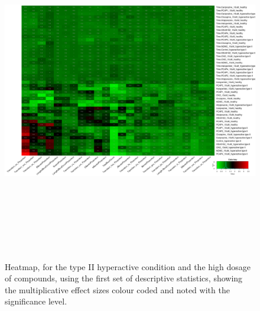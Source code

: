 \documentclass[a4paper,12pt]{article}
\begin{document}
\begin{figure}[h!]
\begin{center}
\includegraphics[width=16cm,height=15cm]{DarkPTZ_heatmap_10_microM_DarkPTZ_B2MAP.png}
\caption{Heatmap, for the type II hyperactive condition and the high dosage of compounds, using the first set of descriptive statistics, showing the multiplicative effect sizes colour coded and noted with the significance level.}
\end{center}
\end{figure}
\newpage
\end{document}

